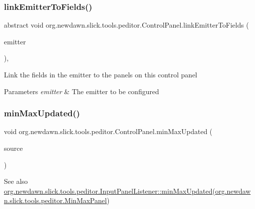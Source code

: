 \subsubsection{\texorpdfstring{link\+Emitter\+To\+Fields()}{linkEmitterToFields()}}
{\footnotesize\ttfamily abstract void org.\+newdawn.\+slick.\+tools.\+peditor.\+Control\+Panel.\+link\+Emitter\+To\+Fields (\begin{DoxyParamCaption}\item[{\mbox{\hyperlink{classorg_1_1newdawn_1_1slick_1_1particles_1_1_configurable_emitter}{Configurable\+Emitter}}}]{emitter }\end{DoxyParamCaption})\hspace{0.3cm}{\ttfamily [abstract]}, {\ttfamily [protected]}}

Link the fields in the emitter to the panels on this control panel


\begin{DoxyParams}{Parameters}
{\em emitter} & The emitter to be configured \\
\hline
\end{DoxyParams}
\mbox{\label{classorg_1_1newdawn_1_1slick_1_1tools_1_1peditor_1_1_control_panel_ae8f9c3f55e43dad862c8520af7c3fac8}} 
\subsubsection{\texorpdfstring{min\+Max\+Updated()}{minMaxUpdated()}}
{\footnotesize\ttfamily void org.\+newdawn.\+slick.\+tools.\+peditor.\+Control\+Panel.\+min\+Max\+Updated (\begin{DoxyParamCaption}\item[{\mbox{\hyperlink{classorg_1_1newdawn_1_1slick_1_1tools_1_1peditor_1_1_min_max_panel}{Min\+Max\+Panel}}}]{source }\end{DoxyParamCaption})\hspace{0.3cm}{\ttfamily [inline]}}

\begin{DoxySeeAlso}{See also}
\mbox{\hyperlink{interfaceorg_1_1newdawn_1_1slick_1_1tools_1_1peditor_1_1_input_panel_listener_a2f2fda874b026dd19ca947af14bc65c0}{org.\+newdawn.\+slick.\+tools.\+peditor.\+Input\+Panel\+Listener\+::min\+Max\+Updated}}(\mbox{\hyperlink{classorg_1_1newdawn_1_1slick_1_1tools_1_1peditor_1_1_min_max_panel}{org.\+newdawn.\+slick.\+tools.\+peditor.\+Min\+Max\+Panel}}) 
\end{DoxySeeAlso}



